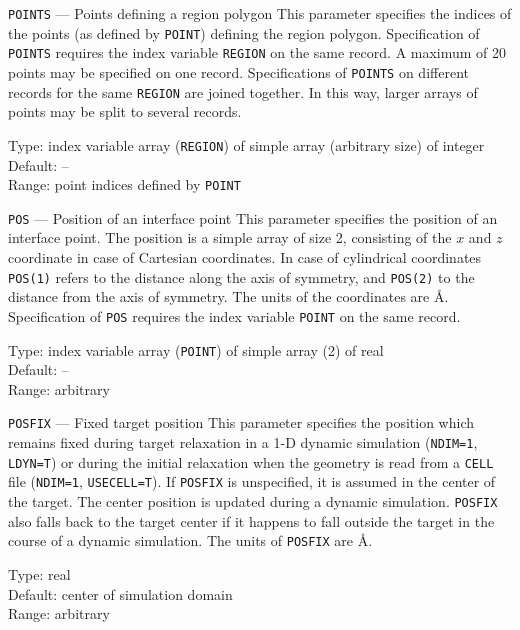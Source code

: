 \begin{keydescription}{\texttt{POINTS} --- Points defining a region polygon}
%
  This parameter specifies the indices of the points (as defined by
  \texttt{POINT}) defining the region polygon.  Specification of
  \texttt{POINTS} requires the index variable \texttt{REGION} on the same
  record. A maximum of 20 points may be specified on one record.
  Specifications of \texttt{POINTS} on different records for the same
  \texttt{REGION} are joined together.  In this way, larger arrays of points 
  may be split to several records.  
  \begin{keytab}
    Type:    \> index variable array (\texttt{REGION}) of simple array
    (arbitrary size) of integer \\
    Default: \> -- \\
    Range:   \> point indices defined by \texttt{POINT} 
  \end{keytab}
\end{keydescription}

\begin{keydescription}{\texttt{POS} --- Position of an interface point}
%
  This parameter specifies the position of an interface point. The
  position is a simple array of size 2, consisting of the $x$ and $z$
  coordinate in case of Cartesian coordinates. In case of cylindrical
  coordinates \texttt{POS(1)} refers to the distance along the axis of
  symmetry, and \texttt{POS(2)} to the distance from the axis of symmetry.
  The units of the coordinates are \AA.  Specification of \texttt{POS} 
  requires the index variable \texttt{POINT} on the same record. 
  \begin{keytab}
    Type:    \> index variable array (\texttt{POINT}) of simple array
                (2) of real \\
    Default: \> -- \\
   Range:    \> arbitrary
\end{keytab}
\end{keydescription}

\begin{keydescription}{\texttt{POSFIX} --- Fixed target position}
%
  This parameter specifies the position which remains fixed during
  target relaxation in a 1-D dynamic simulation (\texttt{NDIM=1},
  \texttt{LDYN=T}) or during the initial relaxation when the geometry is read 
  from a \texttt{CELL} file (\texttt{NDIM=1}, \texttt{USECELL=T}).  If 
  \texttt{POSFIX} is unspecified, it is assumed in the center of the target.
  The center position is updated during a dynamic simulation. \texttt{POSFIX}
  also falls back to the target center if it happens to fall outside the target
  in the course of a dynamic simulation.  The units of \texttt{POSFIX} are \AA.
  \begin{keytab}
    Type:    \> real \\
   Default:  \> center of simulation domain \\
   Range:    \> arbitrary
\end{keytab}
\end{keydescription}

